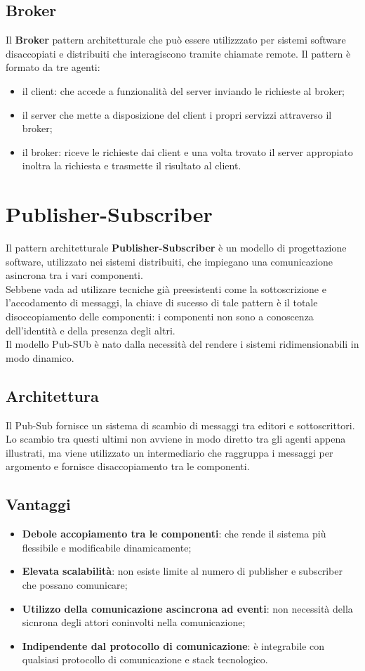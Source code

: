 \documentclass{article}
\begin{document}
\subsection{Broker}
Il \textbf{Broker} pattern architetturale che può essere utilizzzato per sistemi software disaccopiati e distribuiti che interagiscono tramite chiamate remote.
Il pattern è formato da tre agenti:
\begin{itemize}
    \item il client: che accede a funzionalità del server inviando le richieste al broker;
    \item il server che mette a disposizione del client i propri servizzi attraverso il broker;
    \item il broker: riceve le richieste dai client e una volta trovato il server appropiato inoltra la richiesta e trasmette il risultato al client.
\end{itemize}
\section{Publisher-Subscriber}
Il pattern architetturale \textbf{Publisher-Subscriber} è un modello di progettazione software, utilizzato nei sistemi distribuiti, che impiegano una comunicazione asincrona tra i vari componenti.\\
Sebbene vada ad utilizare tecniche già preesistenti come la sottoscrizione e l'accodamento di messaggi, la  chiave di sucesso di tale pattern è il totale disoccopiamento delle componenti: i componenti non sono a conoscenza dell'identità e della presenza degli altri.\\
Il modello Pub-SUb è nato dalla necessità del rendere i sistemi ridimensionabili in modo dinamico.
\subsection{Architettura}
Il Pub-Sub fornisce un sistema di scambio di messaggi tra editori e sottoscrittori. Lo scambio tra questi ultimi non avviene in modo diretto tra gli agenti appena illustrati, ma viene utilizzato un intermediario che raggruppa i messaggi per argomento e fornisce disaccopiamento tra le componenti.
\subsection{Vantaggi}
\begin{itemize}
    \item \textbf{Debole accopiamento tra le componenti}: che rende il sistema più flessibile e modificabile dinamicamente;
    \item \textbf{Elevata scalabilità}: non esiste limite al numero di publisher e subscriber che possano comunicare;
    \item \textbf{Utilizzo della comunicazione ascincrona ad eventi}: non necessità della sicnrona degli attori coninvolti nella comunicazione;
    \item \textbf{Indipendente dal protocollo di comunicazione}: è integrabile con qualsiasi protocollo di comunicazione e stack tecnologico.
\end{itemize}
\end{document}
